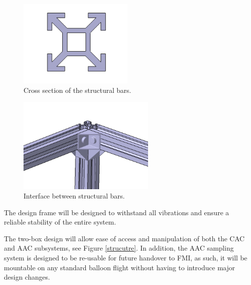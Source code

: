 \documentclass[a4paper,12pt,twoside]{article}
\providecommand{\DIFaddbeginFL}{} %
\providecommand{\DIFaddendFL}{} %
\providecommand{\DIFdelbeginFL}{} %
\providecommand{\DIFdelendFL}{} %
\newcommand{\DIFscaledelfig}{0.5}
\newlength{\DIFdelgraphicswidth} %
\newlength{\DIFdelgraphicsheight} %
\newcommand{\DIFaddincludegraphics}[2][]{{\color{blue}\fbox{\DIFOincludegraphics[#1]{#2}}}} %
\newcommand{\DIFdelincludegraphics}[2][]{%
\sbox{\DIFdelgraphicsbox}{\DIFOincludegraphics[#1]{#2}}%
\settoboxwidth{\DIFdelgraphicswidth}{\DIFdelgraphicsbox} %
\settoboxtotalheight{\DIFdelgraphicsheight}{\DIFdelgraphicsbox} %
\scalebox{\DIFscaledelfig}{%
\parbox[b]{\DIFdelgraphicswidth}{\usebox{\DIFdelgraphicsbox}\\[-\baselineskip] \rule{\DIFdelgraphicswidth}{0em}}\llap{\resizebox{\DIFdelgraphicswidth}{\DIFdelgraphicsheight}{%
\setlength{\unitlength}{\DIFdelgraphicswidth}%
\begin{picture}(1,1)%
\thicklines\linethickness{2pt} %
{\color[rgb]{1,0,0}\put(0,0){\framebox(1,1){}}}%
{\color[rgb]{1,0,0}\put(0,0){\line( 1,1){1}}}%
{\color[rgb]{1,0,0}\put(0,1){\line(1,-1){1}}}%
\end{picture}%
}\hspace*{3pt}}} %
} %
\DeclareRobustCommand{\DIFaddbeginFL}{\DIFOaddbeginFL \let\includegraphics\DIFaddincludegraphics} %
\DeclareRobustCommand{\DIFaddendFL}{\DIFOaddendFL \let\includegraphics\DIFOincludegraphics} %
\DeclareRobustCommand{\DIFdelbeginFL}{\DIFOdelbeginFL \let\includegraphics\DIFdelincludegraphics} %
\DeclareRobustCommand{\DIFdelendFL}{\DIFOaddendFL \let\includegraphics\DIFOincludegraphics} %
\begin{document}
\begin{figure}[!ht]
    \centering
    \includegraphics[width=0.5\textwidth]{4-experiment-design/img/1_cross_section.jpg}
    \caption{Cross section of the structural bars.}
    \label{cross-section}
\end{figure}


\begin{figure}[!ht]
    \centering
    \DIFdelbeginFL %
\DIFdelendFL \DIFaddbeginFL \includegraphics[width=0.6\textwidth]{4-experiment-design/img/bars_joint.jpg}
    \DIFaddendFL \caption{Interface between structural bars.}
    \label{3_bars_joined}
\end{figure}

The design frame will be designed to withstand all vibrations and ensure a reliable stability of the entire system. 

The two-box design will allow ease of access and manipulation of both the CAC and AAC subsystems, see Figure \ref{strucutre}. In addition, the AAC sampling system is designed to be re-usable for future handover to FMI, as such, it will be mountable on any standard balloon flight without having to introduce major design changes.
\end{document}
